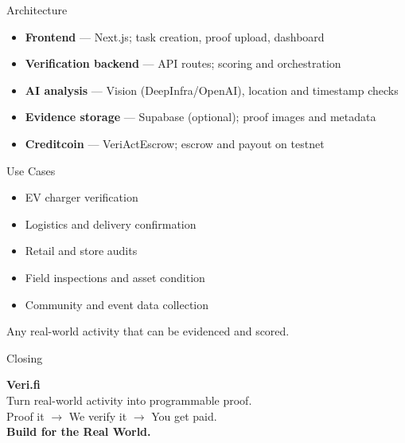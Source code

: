 \documentclass[11pt]{beamer}
\begin{document}
\begin{frame}{Architecture}
\begin{itemize}
\item \textbf{Frontend} — Next.js; task creation, proof upload, dashboard
\item \textbf{Verification backend} — API routes; scoring and orchestration
\item \textbf{AI analysis} — Vision (DeepInfra/OpenAI), location and timestamp checks
\item \textbf{Evidence storage} — Supabase (optional); proof images and metadata
\item \textbf{Creditcoin} — VeriActEscrow; escrow and payout on testnet
\end{itemize}
\end{frame}

\begin{frame}{Use Cases}
\begin{itemize}
\item EV charger verification
\item Logistics and delivery confirmation
\item Retail and store audits
\item Field inspections and asset condition
\item Community and event data collection
\end{itemize}
\vspace{0.5em}
Any real-world activity that can be evidenced and scored.
\end{frame}

\begin{frame}{Closing}
\begin{center}
\Large \textbf{Veri.fi} \\
\large Turn real-world activity into programmable proof. \\
\vspace{1em}
Proof it $\rightarrow$ We verify it $\rightarrow$ You get paid. \\
\vspace{1em}
\textbf{Build for the Real World.}
\end{center}
\end{frame}
\end{document}
